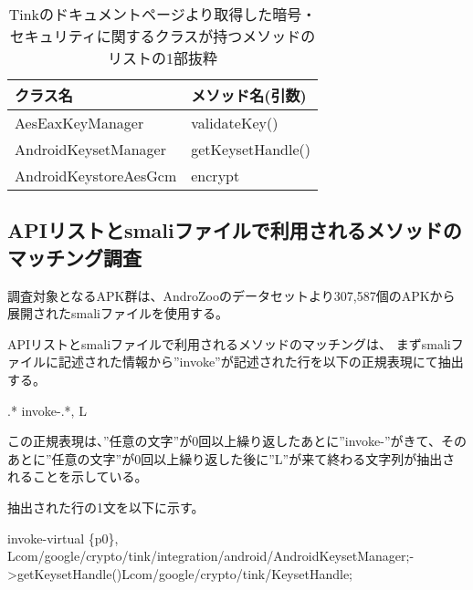 \begin{table}[t]
\begin{center}
\caption{Tinkのドキュメントページより取得した暗号・セキュリティに関するクラスが持つメソッドのリストの1部抜粋}
\begin{tabular}{ll} \hline
クラス名 & メソッド名(引数) \\ \hline
AesEaxKeyManager & validateKey() \\
AndroidKeysetManager & getKeysetHandle() \\
AndroidKeystoreAesGcm &  encrypt\\ \hline
\end{tabular}
\label{tb:APImethod}
\end{center}
\end{table}

\newpage

\subsection{APIリストとsmaliファイルで利用されるメソッドのマッチング調査}
\label{sec:調査}
調査対象となるAPK群は、AndroZoo\cite{AndroZoo}のデータセットより307,587個のAPKから展開されたsmaliファイルを使用する。

APIリストとsmaliファイルで利用されるメソッドのマッチングは、
まずsmaliファイルに記述された情報から”invoke”が記述された行を以下の正規表現にて抽出する。

\begin{center} .* invoke-.*, L \end{center}

この正規表現は、”任意の文字”が0回以上繰り返したあとに”invoke-”がきて、そのあとに”任意の文字”が0回以上繰り返した後に”L”が来て終わる文字列が抽出されることを示している。

抽出された行の1文を以下に示す。

\begin{center} invoke-virtual \{p0\}, Lcom/google/crypto/tink/integration/android/AndroidKeysetManager;-\textgreater getKeysetHandle()Lcom/google/crypto/tink/KeysetHandle;\end{center}　


